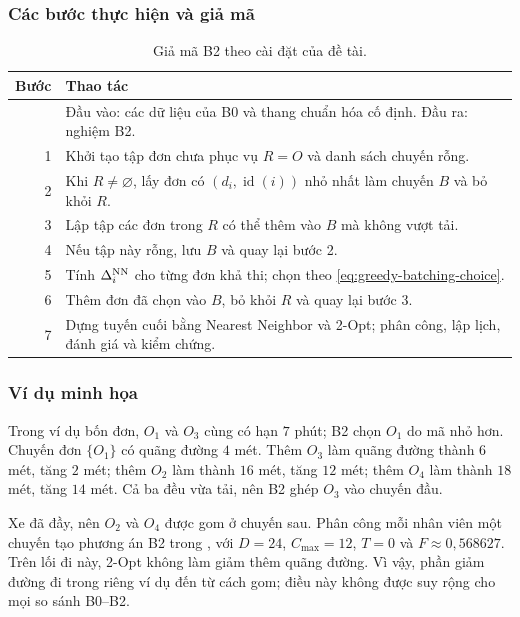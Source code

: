 \subsubsection{Các bước thực hiện và giả mã}
\begin{table}[H]
\centering\small
\begin{tabularx}{\linewidth}{rX}
\toprule
Bước & Thao tác \\
\midrule
 & Đầu vào: các dữ liệu của B0 và thang chuẩn hóa cố định. Đầu ra: nghiệm B2. \\
1 & Khởi tạo tập đơn chưa phục vụ $R=O$ và danh sách chuyến rỗng. \\
2 & Khi $R\neq\varnothing$, lấy đơn có $(d_i,\operatorname{id}(i))$ nhỏ nhất làm chuyến $B$ và bỏ khỏi $R$. \\
3 & Lập tập các đơn trong $R$ có thể thêm vào $B$ mà không vượt tải. \\
4 & Nếu tập này rỗng, lưu $B$ và quay lại bước 2. \\
5 & Tính $\Delta_i^{\rm NN}$ cho từng đơn khả thi; chọn theo \eqref{eq:greedy-batching-choice}. \\
6 & Thêm đơn đã chọn vào $B$, bỏ khỏi $R$ và quay lại bước 3. \\
7 & Dựng tuyến cuối bằng Nearest Neighbor và 2-Opt; phân công, lập lịch, đánh giá và kiểm chứng. \\
\bottomrule
\end{tabularx}
\caption{Giả mã B2 theo cài đặt của đề tài.}\label{tab:b2-pseudocode}
\end{table}

\subsubsection{Ví dụ minh họa}
Trong ví dụ bốn đơn, $O_1$ và $O_3$ cùng có hạn $7$ phút; B2 chọn $O_1$ do mã nhỏ hơn. Chuyến đơn $\{O_1\}$ có quãng đường $4$ mét. Thêm $O_3$ làm quãng đường thành $6$ mét, tăng $2$ mét; thêm $O_2$ làm thành $16$ mét, tăng $12$ mét; thêm $O_4$ làm thành $18$ mét, tăng $14$ mét. Cả ba đều vừa tải, nên B2 ghép $O_3$ vào chuyến đầu.

Xe đã đầy, nên $O_2$ và $O_4$ được gom ở chuyến sau. Phân công mỗi nhân viên một chuyến tạo phương án B2 trong , với $D=24$, $C_{\max}=12$, $T=0$ và $F\approx0{,}568627$. Trên lối đi này, 2-Opt không làm giảm thêm quãng đường. Vì vậy, phần giảm đường đi trong riêng ví dụ đến từ cách gom; điều này không được suy rộng cho mọi so sánh B0--B2.


